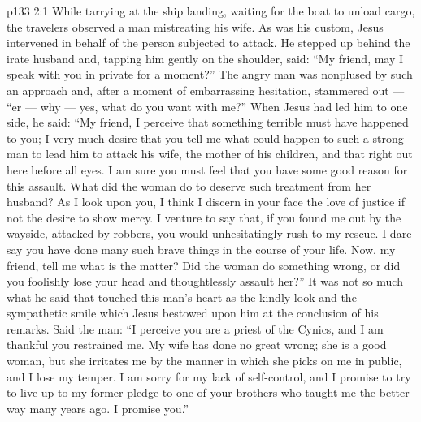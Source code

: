 \vs p133 2:1 While tarrying at the ship landing, waiting for the boat to unload cargo, the travelers observed a man mistreating his wife. As was his custom, Jesus intervened in behalf of the person subjected to attack. He stepped up behind the irate husband and, tapping him gently on the shoulder, said: \textcolor{ubdarkred}{“My friend, may I speak with you in private for a moment?”} The angry man was nonplused by such an approach and, after a moment of embarrassing hesitation, stammered out --- “er --- why --- yes, what do you want with me?” When Jesus had led him to one side, he said: \textcolor{ubdarkred}{“My friend, I perceive that something terrible must have happened to you; I very much desire that you tell me what could happen to such a strong man to lead him to attack his wife, the mother of his children, and that right out here before all eyes. I am sure you must feel that you have some good reason for this assault. What did the woman do to deserve such treatment from her husband? As I look upon you, I think I discern in your face the love of justice if not the desire to show mercy. I venture to say that, if you found me out by the wayside, attacked by robbers, you would unhesitatingly rush to my rescue. I dare say you have done many such brave things in the course of your life. Now, my friend, tell me what is the matter? Did the woman do something wrong, or did you foolishly lose your head and thoughtlessly assault her?”} It was not so much what he said that touched this man’s heart as the kindly look and the sympathetic smile which Jesus bestowed upon him at the conclusion of his remarks. Said the man: “I perceive you are a priest of the Cynics, and I am thankful you restrained me. My wife has done no great wrong; she is a good woman, but she irritates me by the manner in which she picks on me in public, and I lose my temper. I am sorry for my lack of self\hyp{}control, and I promise to try to live up to my former pledge to one of your brothers who taught me the better way many years ago. I promise you.”
